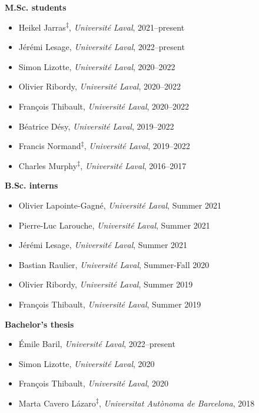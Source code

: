\documentclass[11pt]{article}
\begin{document}
%
%
%
\textbf{M.Sc. students}
%
\begin{itemize}
  \item Heikel Jarras\textsuperscript{$\ddagger$}, \textit{Universit\'e Laval}, 2021--present
  \item Jérémi Lesage, \textit{Universit\'e Laval}, 2022--present
  \item Simon Lizotte, \textit{Universit\'e Laval}, 2020--2022 \href{http://antoineallard.github.io/files/theses/Lizotte.2022.MSc.pdf}{}
  \item Olivier Ribordy, \textit{Universit\'e Laval}, 2020--2022
  \item Fran\c{c}ois Thibault, \textit{Universit\'e Laval}, 2020--2022 \href{http://antoineallard.github.io/files/theses/Thibault.2022.MSc.pdf}{}
  \item B\'eatrice D\'esy, \textit{Universit\'e Laval}, 2019--2022 \href{http://antoineallard.github.io/files/theses/Desy.2022.MSc.pdf}{}
  \item Francis Normand\textsuperscript{$\ddagger$}, \textit{Universit\'e Laval}, 2019--2022 \href{http://hdl.handle.net/20.500.11794/73573}{}
  \item Charles Murphy\textsuperscript{$\ddagger$}, \textit{Universit\'e Laval}, 2016--2017 \href{http://hdl.handle.net/20.500.11794/30382}{}
\end{itemize}
%
%
%
\textbf{B.Sc. interns}
%
\begin{itemize}
  \item Olivier Lapointe-Gagn\'e, \textit{Universit\'e Laval}, Summer 2021
  \item Pierre-Luc Larouche, \textit{Universit\'e Laval}, Summer 2021
  \item Jérémi Lesage, \textit{Universit\'e Laval}, Summer 2021
  \item Bastian Raulier, \textit{Universit\'e Laval}, Summer-Fall 2020
  \item Olivier Ribordy, \textit{Universit\'e Laval}, Summer 2019
  \item Fran\c{c}ois Thibault, \textit{Universit\'e Laval}, Summer 2019
\end{itemize}
%
%
%
\newpage\noindent%
\textbf{Bachelor's thesis}
%
\begin{itemize}
  \item Émile Baril, \textit{Universit\'e Laval}, 2022--present
  \item Simon Lizotte, \textit{Universit\'e Laval}, 2020
  \item Fran\c{c}ois Thibault, \textit{Universit\'e Laval}, 2020
  \item Marta Cavero L\'azaro\textsuperscript{$\ddagger$}, \textit{Universitat Aut\`onoma de Barcelona}, 2018
\end{itemize} \vspace{0.75\baselineskip}
\end{document}
